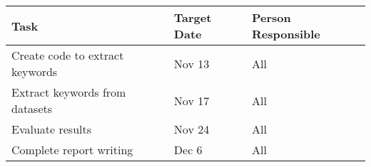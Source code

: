 \documentclass[11pt,a4paper]{article}
\begin{document}
\begin{table}[h]
\begin{center}
\begin{tabular}{|p{3.3cm}|p{1.4cm}|p{1.7cm}|}
\hline \bf Task & \bf Target Date & \bf Person  Responsible \\  
\hline
 Create code to extract keywords & Nov 13 & All \\ 
\hline 
 Extract keywords from datasets & Nov 17 & All \\
\hline
 Evaluate results & Nov 24 & All \\
\hline
Complete report writing & Dec 6 & All  \\
\hline   
\end{tabular}
\end{center}
\end{table}



%
%


\end{document}

